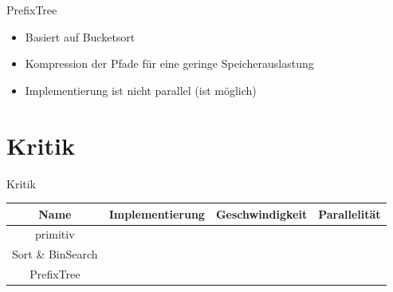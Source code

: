 \documentclass[11pt, xcolor=dvipsnames]{beamer}
\begin{document}
	
	\begin{frame}{PrefixTree}
		\begin{itemize}
			\item Basiert auf Bucketsort
			\item Kompression der Pfade für eine geringe Speicherauslastung
			\item Implementierung ist nicht parallel (ist möglich)
		\end{itemize}
	\end{frame}
	
	\section{Kritik}
	\begin{frame}{Kritik}
		
		\begin{tabular}{c|ccc}
			\textbf{Name}	&  Implementierung & Geschwindigkeit & Parallelität \\ 
			\hline
			primitiv	& \cellcolor{green} & \cellcolor{red} & \cellcolor{green}  \\ 
			Sort \& BinSearch	& \cellcolor{yellow} & \cellcolor{green} & \cellcolor{yellow} \\
			PrefixTree & \cellcolor{orange}  & \cellcolor{yellow} & \cellcolor{red} 
		\end{tabular}
		
	\end{frame}
\end{document}
